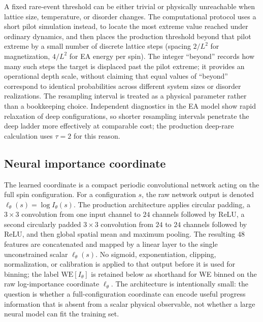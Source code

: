 \documentclass[a4paper,fleqn]{cas-sc}
\newcommand{\WE}{\mathrm{WE}}
\begin{document}
A fixed rare-event threshold can be either trivial or physically unreachable when lattice
size, temperature, or disorder changes. The computational protocol uses a short pilot
simulation instead, to locate the most extreme value reached under ordinary dynamics, and then
places the production threshold beyond that pilot extreme by a small number of discrete
lattice steps (spacing $2/L^2$ for magnetization, $4/L^2$ for EA energy per spin). The integer
``beyond'' records how many such steps the target is displaced past the pilot extreme; it
provides an operational depth scale, without claiming that equal values of ``beyond''
correspond to identical probabilities across different system sizes or disorder realizations.
The resampling interval is treated as a physical parameter rather than a bookkeeping choice.
Independent diagnostics in the EA model show rapid relaxation of deep configurations, so
shorter resampling intervals penetrate the deep ladder more effectively at comparable cost;
the production deep-rare calculation uses $\tau=2$ for this reason.

\subsection{Neural importance coordinate}\label{sec:neural}
The learned coordinate is a compact periodic convolutional network acting on the full spin
configuration.  For a configuration $s$, the raw network output is denoted
$\ell_\theta(s)=\log I_\theta(s)$.  The production architecture applies circular padding,
a $3\times3$ convolution from one input channel to $24$ channels followed by ReLU, a second
circularly padded $3\times3$ convolution from $24$ to $24$ channels followed by ReLU, and then
global spatial mean and maximum pooling.  The resulting $48$ features are concatenated and
mapped by a linear layer to the single unconstrained scalar $\ell_\theta(s)$.  No sigmoid,
exponentiation, clipping, normalization, or calibration is applied to that output before it is
used for binning; the label $\WE[I_\theta]$ is retained below as shorthand for WE binned on the
raw log-importance coordinate $\ell_\theta$.  The architecture is intentionally small: the
question is whether a full-configuration coordinate can encode useful progress information
that is absent from a scalar physical observable, not whether a large neural model can fit the
training set.
\end{document}
